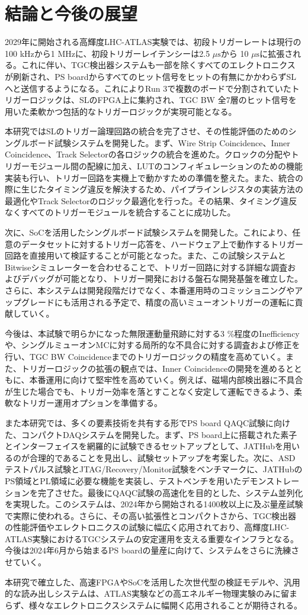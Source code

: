 \chapter{結論と今後の展望}
\label{chap_conclusion}

2029年に開始される高輝度LHC-ATLAS実験では、初段トリガーレートは現行の100 kHzから1 MHzに、初段トリガーレイテンシーは2.5 $\mu\mathrm{s}$から 10 $\mu\mathrm{s}$に拡張される。これに伴い、TGC検出器システムも一部を除くすべてのエレクトロニクスが刷新され、PS boardからすべてのヒット信号をヒットの有無にかかわらずSLへと送信するようになる。これによりRun 3で複数のボードで分割されていたトリガーロジックは、SLのFPGA上に集約され、TGC BW 全7層のヒット信号を用いた柔軟かつ包括的なトリガーロジックが実現可能となる。

本研究ではSLのトリガー論理回路の統合を完了させ、その性能評価のためのシングルボード試験システムを開発した。まず、Wire Strip Coincidence、Inner Coincidence、Track Selectorの各ロジックの統合を進めた。クロックの分配やトリガーモジュール間の配線に加え、LUTのコンフィギュレーションのための機能実装も行い、トリガー回路を実機上で動かすための準備を整えた。また、統合の際に生じたタイミング違反を解決するため、パイプラインレジスタの実装方法の最適化やTrack Selectorのロジック最適化を行った。その結果、タイミング違反なくすべてのトリガーモジュールを統合することに成功した。

次に、SoCを活用したシングルボード試験システムを開発した。これにより、任意のデータセットに対するトリガー応答を、ハードウェア上で動作するトリガー回路を直接用いて検証することが可能となった。また、この試験システムとBitwiseシミュレーターを合わせることで、トリガー回路に対する詳細な調査およびデバッグが可能となり、トリガー開発における盤石な開発基盤を確立した。
さらに、本システムは開発段階だけでなく、本番運用時のコミッショニングやアップグレードにも活用される予定で、精度の高いミューオントリガーの運転に貢献していく。

今後は、本試験で明らかになった無限運動量飛跡に対する3 \%程度のInefficiencyや、シングルミューオンMCに対する局所的な不具合に対する調査および修正を行い、TGC BW Coincidenceまでのトリガーロジックの精度を高めていく。また、トリガーロジックの拡張の観点では、Inner Coincidenceの開発を進めるとともに、本番運用に向けて堅牢性を高めていく。例えば、磁場内部検出器に不具合が生じた場合でも、トリガー効率を落とすことなく安定して運転できるよう、柔軟なトリガー運用オプションを準備する。

また本研究では、多くの要素技術を共有する形でPS board QAQC試験に向けた、コンパクトDAQシステムを開発した。まず、PS board上に搭載された素子とインターフェイスを網羅的に試験できるセットアップとして、JATHubを用いるのが合理的であることを見出し、試験セットアップを考案した。次に、ASDテストパルス試験とJTAG/Recovery/Monitor試験をベンチマークに、JATHubのPS領域とPL領域に必要な機能を実装し、テストベンチを用いたデモンストレーションを完了させた。最後にQAQC試験の高速化を目的とした、システム並列化を実現した。このシステムは、2024年から開始される1400枚以上に及ぶ量産試験で実際に使われる。さらに、その高い拡張性とコンパクトさから、TGC検出器の性能評価やエレクトロニクスの試験に幅広く応用されており、高輝度LHC-ATLAS実験におけるTGCシステムの安定運用を支える重要なインフラとなる。今後は2024年6月から始まるPS boardの量産に向けて、システムをさらに洗練させていく。

本研究で確立した、高速FPGAやSoCを活用した次世代型の検証モデルや、汎用的な読み出しシステムは、ATLAS実験などの高エネルギー物理実験のみに留まらず、様々なエレクトロニクスシステムに幅開く応用されることが期待される。


